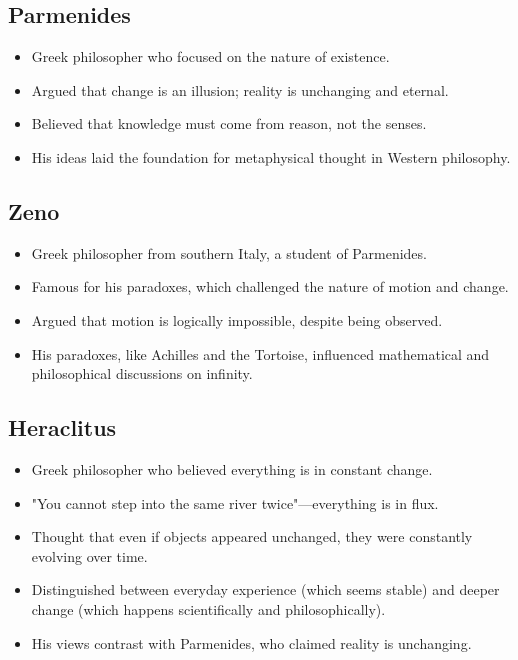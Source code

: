 \subsection{Parmenides}

\begin{itemize}
    \item Greek philosopher who focused on the nature of existence.
    \item Argued that change is an illusion; reality is unchanging and eternal.
    \item Believed that knowledge must come from reason, not the senses.
    \item His ideas laid the foundation for metaphysical thought in Western philosophy.
\end{itemize}

\subsection{Zeno}

\begin{itemize}
    \item Greek philosopher from southern Italy, a student of Parmenides.
    \item Famous for his paradoxes, which challenged the nature of motion and change.
    \item Argued that motion is logically impossible, despite being observed.
    \item His paradoxes, like Achilles and the Tortoise, influenced mathematical and philosophical discussions on infinity.
\end{itemize}

\subsection{Heraclitus}

\begin{itemize}
    \item Greek philosopher who believed everything is in constant change.
    \item "You cannot step into the same river twice"—everything is in flux.
    \item Thought that even if objects appeared unchanged, they were constantly evolving over time.
    \item Distinguished between everyday experience (which seems stable) and deeper change (which happens scientifically and philosophically).
    \item His views contrast with Parmenides, who claimed reality is unchanging.
\end{itemize}